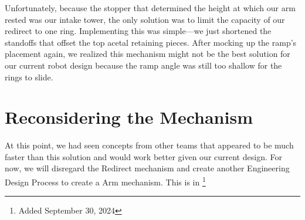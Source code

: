 Unfortunately, because the stopper that determined the height at which our arm rested was our intake tower, the only solution was to limit the capacity of our redirect to one ring. Implementing this was simple—we just shortened the standoffs that offset the top acetal retaining pieces. After mocking up the ramp’s placement again, we realized this mechanism might not be the best solution for our current robot design because the ramp angle was still too shallow for the rings to slide.

\section*{Reconsidering the Mechanism}

At this point, we had seen concepts from other teams that appeared to be much faster than this solution and would work better given our current design. For now, we will disregard the Redirect mechanism and create another Engineering Design Process to create a Arm mechanism. This is in   \footnote{Added September 30, 2024}

